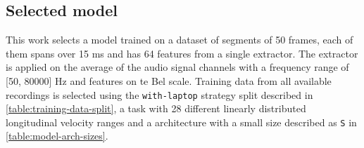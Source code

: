 \subsection{Selected model} \label{sec:selected-model} 

This work selects a model trained on a dataset of segments of 50 frames, each
of them spans over 15 ms and has 64 features from a single
 extractor. The extractor is applied on
the average of the audio signal channels with a frequency range of [50, 80000]
Hz and features on te Bel scale. Training data from all available recordings is
selected using the \texttt{with-laptop} strategy split described in
\cref{table:training-data-split}, a  task
with 28 different linearly distributed longitudinal velocity ranges and a
 architecture with a small size described as
\texttt{S} in \cref{table:model-arch-sizes}. 